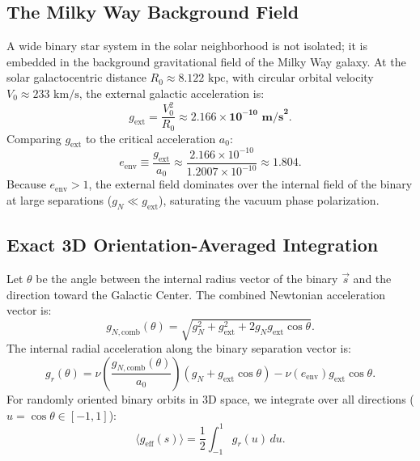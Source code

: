 \documentclass[11pt,a4paper]{article}
\begin{document}
\subsection{The Milky Way Background Field}
A wide binary star system in the solar neighborhood is not isolated; it is embedded in the background gravitational field of the Milky Way galaxy.
At the solar galactocentric distance $R_0 \approx 8.122\text{ kpc}$, with circular orbital velocity $V_0 \approx 233\text{ km/s}$, the external galactic acceleration is:
\begin{equation}
g_{\mathrm{ext}} = \frac{V_0^2}{R_0} \approx \mathbf{2.166 \times 10^{-10}\text{ m/s}^2}.
\end{equation}
Comparing $g_{\mathrm{ext}}$ to the critical acceleration $a_0$:
\begin{equation}
e_{\mathrm{env}} \equiv \frac{g_{\mathrm{ext}}}{a_0} \approx \frac{2.166 \times 10^{-10}}{1.2007 \times 10^{-10}} \approx \mathbf{1.804}.
\end{equation}
Because $e_{\mathrm{env}} > 1$, the external field dominates over the internal field of the binary at large separations ($g_N \ll g_{\mathrm{ext}}$), saturating the vacuum phase polarization.

\subsection{Exact 3D Orientation-Averaged Integration}
Let $\theta$ be the angle between the internal radius vector of the binary $\vec{s}$ and the direction toward the Galactic Center. The combined Newtonian acceleration vector is:
\begin{equation}
g_{N,\mathrm{comb}}(\theta) = \sqrt{g_N^2 + g_{\mathrm{ext}}^2 + 2 g_N g_{\mathrm{ext}} \cos\theta}.
\end{equation}
The internal radial acceleration along the binary separation vector is:
\begin{equation}
g_r(\theta) = \nu\left(\frac{g_{N,\mathrm{comb}}(\theta)}{a_0}\right) (g_N + g_{\mathrm{ext}} \cos\theta) - \nu(e_{\mathrm{env}}) g_{\mathrm{ext}} \cos\theta.
\end{equation}
For randomly oriented binary orbits in 3D space, we integrate over all directions ($u = \cos\theta \in [-1, 1]$):
\begin{equation}
\langle g_{\mathrm{eff}}(s) \rangle = \frac{1}{2} \int_{-1}^1 g_r(u) \, du.
\end{equation}
\end{document}

